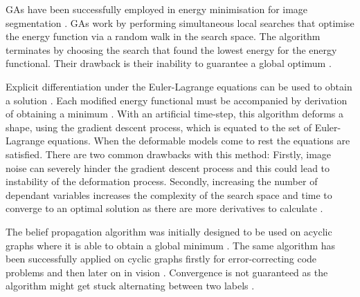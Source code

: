 \begin{definition}
 	GAs have been successfully employed in energy minimisation for image segmentation \citep{MacEachern1998,Ballerini1999,Ballerini2001,Zeipelt2001,Ibanez2009}.
 	GAs work by performing simultaneous local searches that optimise the energy function via a random walk in the search space.
 	The algorithm terminates by choosing the search that found the lowest energy for the energy functional.
 	Their drawback is their inability to guarantee a global optimum \citep{McIntosh2013}.
\end{definition}

\begin{definition}
	Explicit differentiation under the Euler-Lagrange equations can be used to obtain a solution \citep{McIntosh2013}.
	Each modified energy functional must be accompanied by derivation of obtaining a minimum \citep{Terzopoulos1987,Kass1988,Caselles1997,Chan2001}.
	With an artificial time-step, this algorithm deforms a shape, using the gradient descent process, which is equated to the set of Euler-Lagrange equations.
	When the deformable models come to rest the equations are satisfied.
	There are two common drawbacks with this method: Firstly, image noise can severely hinder the gradient descent process and this could lead to instability of the  deformation process.
	Secondly, increasing the number of dependant variables increases the complexity of the search space and time to converge to an optimal solution as there are more derivatives to calculate \citep{McIntosh2013}.
\end{definition}

\begin{definition}
	The belief propagation algorithm was initially designed to be used on acyclic graphs  where it is able to obtain a global minimum \citep{Pearl1988}.
	The same algorithm has been successfully applied on cyclic graphs firstly for error-correcting code problems \citep{Frey1998} and then later on in vision \citep{Freeman2000}.
	Convergence is not guaranteed as the algorithm might get stuck alternating between two labels \citep{Pearl1988}.
\end{definition}
  
